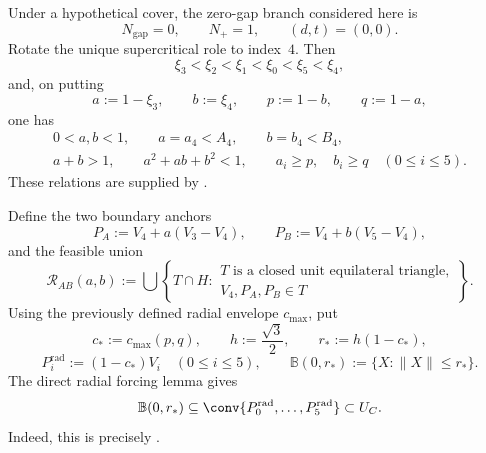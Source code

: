 Under a hypothetical cover, the zero-gap branch considered here is
\[
 N_{\mathrm{gap}}=0,
 \qquad N_+=1,
 \qquad (d,t)=(0,0).
\]
Rotate the unique supercritical role to index~$4$.  Then
\begin{equation}
 \xi_3<\xi_2<\xi_1<\xi_0<\xi_5<\xi_4,
 \label{eq:reader-extreme-chain}
\end{equation}
and, on putting
\begin{equation}
 a:=1-\xi_3,
 \qquad b:=\xi_4,
 \qquad p:=1-b,
 \qquad q:=1-a,
 \label{eq:reader-ab-parameters}
\end{equation}
one has
\begin{equation}
 \begin{gathered}
 0<a,b<1,
 \qquad a=a_4<A_4,
 \qquad b=b_4<B_4,\\
 a+b>1,
 \qquad a^2+ab+b^2<1,
 \qquad
 a_i\ge p,
 \quad b_i\ge q
 \quad(0\le i\le5).
 \end{gathered}
 \label{eq:reader-ab-domain}
\end{equation}
These relations are supplied by .

Define the two boundary anchors
\[
 P_A:=V_4+a(V_3-V_4),
 \qquad
 P_B:=V_4+b(V_5-V_4),
\]
and the feasible union
\[
 \mathcal R_{AB}(a,b):=
 \bigcup\left\{
 T\cap H:
 \begin{array}{l}
 T\text{ is a closed unit equilateral triangle},\\
 V_4,P_A,P_B\in T
 \end{array}
 \right\}.
\]
Using the previously defined radial envelope $c_{\max}$, put
\[
 c_\ast:=c_{\max}(p,q),
 \qquad
 h:=\frac{\sqrt3}{2},
 \qquad
 r_\ast:=h(1-c_\ast),
\]
\[
 P_i^{\mathrm{rad}}:=(1-c_\ast)V_i
 \quad(0\le i\le5),
 \qquad
 \mathbb B(0,r_\ast):=\{X:\lVert X\rVert\le r_\ast\}.
\]
The direct radial forcing lemma gives
\begin{equation}
 \mathbb B(0,r_\ast)
 \subseteq
 \conv\{P_0^{\mathrm{rad}},\ldots,P_5^{\mathrm{rad}}\}
 \subset U_C.
 \label{eq:reader-forced-disk}
\end{equation}
Indeed, this is precisely .


